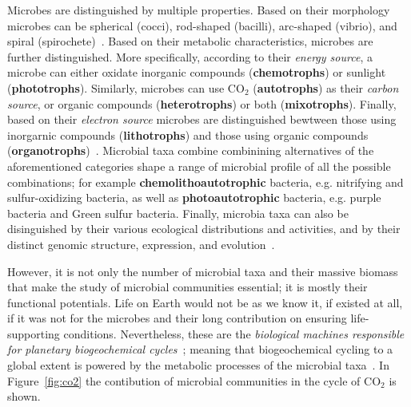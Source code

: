       Microbes are distinguished by multiple properties.
      Based on their morphology microbes can be spherical (cocci), rod-shaped (bacilli),
      arc-shaped (vibrio), and spiral (spirochete)~\cite{dunlap2001microbial}.
      Based on their metabolic characteristics, microbes are further distinguished. 
      More specifically, according to their \textit{energy source}, a microbe
      can either oxidate inorganic compounds (\textbf{chemotrophs}) or sunlight (\textbf{phototrophs}).
      Similarly, microbes can use CO$_2$ (\textbf{autotrophs}) as their \textit{carbon source},
      or organic compounds (\textbf{heterotrophs}) or both (\textbf{mixotrophs}).
      Finally, based on their \textit{electron source} 
      microbes are distinguished bewtween those using inorgarnic compounds (\textbf{lithotrophs}) and those using organic compounds (\textbf{organotrophs})~\cite{madigan2018brock}.
      Microbial taxa combine combinining alternatives of the aforementioned categories 
      shape a range of microbial profile of all the possible combinations; for example      \textbf{chemolithoautotrophic} bacteria, 
      e.g. nitrifying and sulfur-oxidizing bacteria, as well
      as \textbf{photoautotrophic} bacteria, 
      e.g. purple bacteria and Green sulfur bacteria. 
      Finally, microbia taxa can also be disinguished by their various ecological distributions and activities, 
      and by their distinct genomic structure, expression, and evolution~\cite{dunlap2001microbial}. 


      However, 
      it is not only the number of microbial taxa and their massive biomass that
      make the study of microbial communities essential; 
      it is mostly their functional potentials. 
      Life on Earth would not be as we know it, if existed at all, if it was not for the 
      microbes and their long contribution on ensuring life-supporting conditions. 
      Nevertheless, these are the \textit{biological machines responsible for planetary
      biogeochemical cycles}~\cite{falkowski2008microbial}; meaning that biogeochemical cycling 
      to a global extent
      is powered by the metabolic processes of the microbial taxa~\cite{louca2016decoupling}. 
      In Figure~\ref{fig:co2} the contibution of microbial communities 
      in the cycle of CO$_2$ is shown. 

